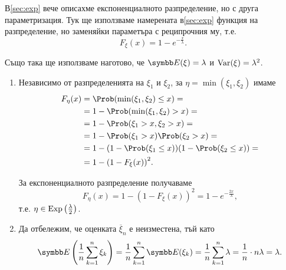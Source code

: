 \documentclass[
  headings=standardclasses,
  bibliography=totocnumbered,
]{scrartcl}
\begin{document}
\begin{solution}
  В\cref{sec:exp} вече описахме експоненциалното разпределение, но с друга параметризация. Тук ще използваме намерената в\cref{sec:exp} функция на разпределение, но заменяйки параметъра с реципрочния му, т.е.
  \begin{equation*}
    F_\xi(x) = 1 - e^{-\frac x \lambda}.
  \end{equation*}

  Също така ще използваме наготово, че \( \Expect(\xi) = \lambda \) и \( \operatorname{Var}(\xi) = \lambda^2 \).

  \begin{enumerate}[label=\alph*)]
    \item Независимо от разпределенията на \( \xi_1 \) и \( \xi_2 \), за \( \eta = \min(\xi_1, \xi_2) \) имаме
    \begin{align*}
      F_\eta(x)
      &=
      \Prob(\min(\xi_1, \xi_2) \leq x)
      = \\ &=
      1 - \Prob(\min(\xi_1, \xi_2) > x)
      = \\ &=
      1 - \Prob(\xi_1 > x, \xi_2 > x)
      = \\ &=
      1 - \Prob(\xi_1 > x) \Prob(\xi_2 > x)
      = \\ &=
      1 - (1 - \Prob(\xi_1 \leq x)) (1 - \Prob(\xi_2 \leq x))
      = \\ &=
      1 - {(1 - F_\xi(x))}^2.
    \end{align*}

    За експоненциалното разпределение получаваме
    \begin{equation*}
      F_\eta(x)
      =
      1 - {(1 - F_\xi(x))}^2
      =
      1 - e^{- \frac {2 x} \lambda},
    \end{equation*}
    т.е. \( \eta \in \operatorname{Exp}\left(\frac \lambda 2 \right) \).

    \item Да отбележим, че оценката \( \overline \xi_n \) е неизместена, тъй като
    \begin{equation*}
      \Expect\left( \frac 1 n \sum_{k=1}^n \xi_k \right)
      =
      \frac 1 n \sum_{k=1}^n \Expect(\xi_k)
      =
      \frac 1 n \sum_{k=1}^n \lambda
      =
      \frac 1 n \cdot n \lambda
      =
      \lambda.
    \end{equation*}


\end{enumerate}
\end{solution}
\end{document}
